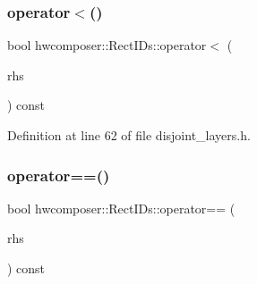 \begin{DoxyCode}{0}
\end{DoxyCode}
\mbox{\label{structhwcomposer_1_1RectIDs_a65b50d48c84aeb3b6cd21488c839d300}} 
\subsubsection{\texorpdfstring{operator$<$()}{operator<()}}
{\footnotesize\ttfamily bool hwcomposer\+::\+Rect\+I\+Ds\+::operator$<$ (\begin{DoxyParamCaption}\item[{const \mbox{\hyperlink{structhwcomposer_1_1RectIDs}{Rect\+I\+Ds}} \&}]{rhs }\end{DoxyParamCaption}) const\hspace{0.3cm}{\ttfamily [inline]}}



Definition at line 62 of file disjoint\+\_\+layers.\+h.


\begin{DoxyCode}{0}
\end{DoxyCode}
\mbox{\label{structhwcomposer_1_1RectIDs_af15bc137ae87e79d042fa048601c09eb}} 
\subsubsection{\texorpdfstring{operator==()}{operator==()}}
{\footnotesize\ttfamily bool hwcomposer\+::\+Rect\+I\+Ds\+::operator== (\begin{DoxyParamCaption}\item[{const \mbox{\hyperlink{structhwcomposer_1_1RectIDs}{Rect\+I\+Ds}} \&}]{rhs }\end{DoxyParamCaption}) const\hspace{0.3cm}{\ttfamily [inline]}}



